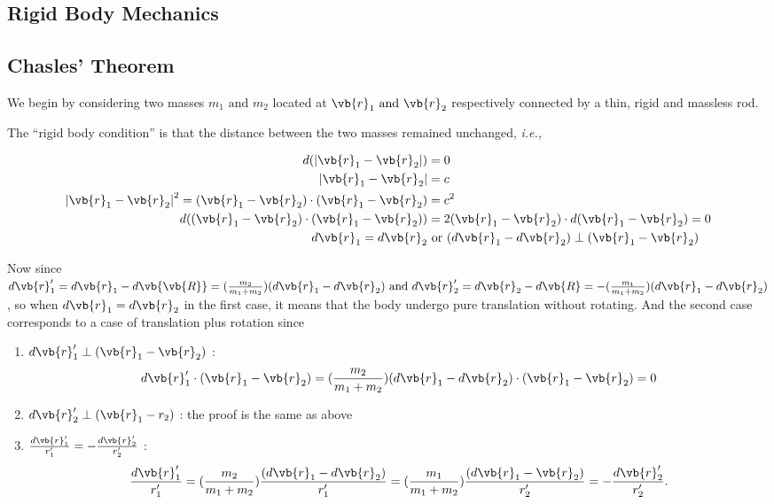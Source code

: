 \documentclass[a4paper,12pt]{report}
\begin{document}
\begin{appendices}
\chapter{Rigid Body Mechanics} 
\section{Chasles' Theorem} \label{ap1}

We begin by considering two masses \(m_{1} \text{ and }  m_{2} \) located at \(\vb{r} _{1} \text{ and } \vb{r} _{2}  \) respectively connected by a thin, rigid and massless rod. 

The ``rigid body condition'' is that the distance between the two masses remained unchanged, \textit{i.e.,} 

\begin{equation}
\begin{aligned}
	d(\left| \vb{r} _{1} - \vb{r} _{2}  \right| ) &= 0 \\
	\left| \vb{r} _{1} - \vb{r} _{2}  \right| &= c \\
	\left| \vb{r} _{1} - \vb{r} _{2}  \right| ^2 = (\vb{r} _{1} - \vb{r} _{2} ) \cdot (\vb{r} _{1} -\vb{r} _{2} ) &= c^2 \\
	d((\vb{r} _{1} - \vb{r} _{2} ) \cdot (\vb{r} _{1} -\vb{r} _{2} ))& = 2(\vb{r} _{1} - \vb{r} _{2} ) \cdot d(\vb{r} _{1} - \vb{r} _{2} ) = 0\\
	d\vb{r} _{1} = d\vb{r} _{2} &\text { or } (d\vb{r} _{1} - d\vb{r} _{2} ) \perp (\vb{r} _{1} - \vb{r} _{2} ) 
\end{aligned}
\end{equation}

Now since \(d\vb{r} '_{1} = d\vb{r} _{1} - d\vb{\vb{R} } = (\frac{m_{2} }{m_{1} + m_{2} }) (d\vb{r} _{1} - d\vb{r} _{2} ) \text{ and }  d\vb{r} '_{2} = d\vb{r} _{2} - d\vb{R} = -(\frac{m_{1} }{m_{1} + m_{2} } )(d\vb{r} _{1} - d\vb{r} _{2} )\), so when \(d\vb{r} _{1} = d\vb{r} _{2} \) in the first case, it means that the body undergo pure translation without rotating. And the second case corresponds to a case of translation plus rotation since 

\begin{enumerate}
	\item \(d\vb{r}'_{1} \perp (\vb{r} _{1} - \vb{r} _{2} ) \) :
		\begin{equation}
			d\vb{r} '_{1} \cdot (\vb{r} _{1} -\vb{r} _{2} ) = (\frac{m_{2} }{m_{1} + m_{2} } )(d\vb{r} _{1} - d\vb{r} _{2} )\cdot (\vb{r} _{1} - \vb{r} _{2} ) = 0
		\end{equation}
	\item \(d\vb{r} '_{2} \perp (\vb{r} _{1} - r_{2} )\) : the proof is the same as above
	\item \(\frac{d\vb{r} '_{1} }{r'_{1} } = -\frac{d\vb{r} '_{2} }{r'_{2} } \) : 
		\begin{equation}
			\frac{d\vb{r} '_{1} }{r'_{1} } = (\frac{m_{2} }{m_{1} + m_{2} } )\frac{(d\vb{r} _{1} - d\vb{r} _{2} )}{r'_{1} } = (\frac{m_{1} }{m_{1} + m_{2} } )\frac{(d\vb{r} _{1} -\vb{r} _{2} )}{r'_{2} } = -\frac{d\vb{r} '_{2} }{r'_{2} } .
		\end{equation}		
\end{enumerate}


\end{appendices}
\end{document}
